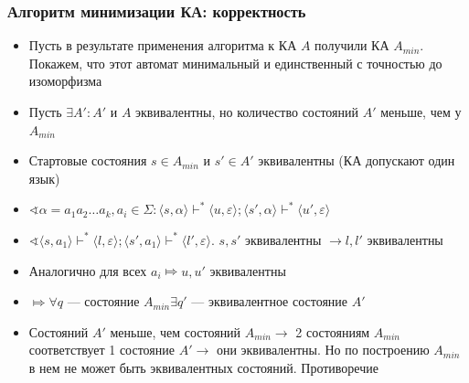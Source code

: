 \documentclass{beamer}
\begin{document}
\begin{frame}[fragile]
  \transwipe[direction=90]
  \frametitle{Алгоритм минимизации КА: корректность}
    \begin{itemize}
      \item Пусть в результате применения алгоритма к КА $A$ получили КА $A_{min}$. Покажем, что этот автомат минимальный и единственный с точностью до изоморфизма
      \item Пусть $\exists A' : A'$ и $A$ эквивалентны, но количество состояний $A'$ меньше, чем у $A_{min}$
      \item Стартовые состояния $s \in A_{min}$ и $s' \in A'$ эквивалентны (КА допускают один язык)
      \item $\sphericalangle \alpha = a_1 a_2 \dots a_k, a_i \in \Sigma: \langle s, \alpha \rangle \vdash^* \langle u, \varepsilon \rangle; \langle s', \alpha \rangle \vdash^* \langle u', \varepsilon \rangle$
      \item $\sphericalangle \langle s, a_1 \rangle \vdash^* \langle l, \varepsilon \rangle; \langle s', a_1 \rangle \vdash^* \langle l', \varepsilon \rangle$. $s, s'$ эквивалентны $\to l, l'$ эквивалентны
      \item Аналогично для всех $a_i \Mapsto u, u'$ эквивалентны
      \item $\Mapsto \forall q$ --- состояние $A_{min} \exists q'$ --- эквивалентное состояние $A'$
      \item Состояний $A'$ меньше, чем состояний $A_{min} \to$ 2 состояниям $A_{min}$ соответствует 1 состояние $A' \to$ они эквивалентны. Но по построению $A_{min}$ в нем не может быть эквивалентных состояний. Противоречие
    \end{itemize}

\end{frame}
\end{document}
